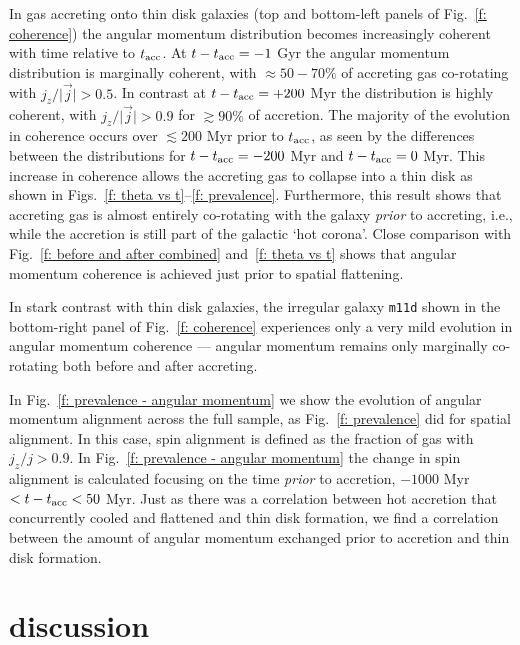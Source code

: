 \documentclass[fleqn,usenatbib]{mnras}
\newcommand{\tacc}{t_{\rm acc}}
\begin{document}
In gas accreting onto thin disk galaxies (top and bottom-left panels of Fig.~\ref{f: coherence})  the angular momentum distribution becomes increasingly coherent with time relative to $\tacc$.
At $t-\tacc=-1$ Gyr the angular momentum distribution is marginally coherent, with $\approx50-70\%$ of accreting gas co-rotating with $j_z/\vert \vec j \vert > 0.5$.
In contrast at $t-\tacc=+200$ Myr the distribution is highly coherent, with $j_z/\vert \vec j \vert > 0.9$ for $\gtrsim 90\%$ of accretion.
The majority of the evolution in coherence occurs over $\lesssim 200$ Myr prior to $\tacc$, as seen by the differences between the distributions for $t-\tacc=-200$ Myr and $t-\tacc=0$ Myr.
This increase in coherence allows the accreting gas to collapse into a thin disk as shown in Figs.~\ref{f: theta vs t}--\ref{f: prevalence}.
Furthermore, this result shows that accreting gas is almost entirely co-rotating with the galaxy {\em prior} to accreting, i.e., while the accretion is still part of the galactic `hot corona'. 
Close comparison with Fig.~\ref{f: before and after combined} and~\ref{f: theta vs t} shows that angular momentum coherence is achieved just prior to spatial flattening. 

In stark contrast with thin disk galaxies, the irregular galaxy \texttt{m11d} shown in the bottom-right panel of Fig.~\ref{f: coherence} experiences only a very mild evolution in angular momentum coherence --- angular momentum remains only marginally co-rotating both before and after accreting.

In Fig.~\ref{f: prevalence - angular momentum} we show the evolution of angular momentum alignment across the full sample, as Fig.~\ref{f: prevalence} did for spatial alignment. 
In this case, spin alignment is defined as the fraction of gas with $j_z/j > 0.9$.
In Fig.~\ref{f: prevalence - angular momentum} the change in spin alignment is calculated focusing on the time \textit{prior} to accretion, $-1000$ Myr $< t - \tacc < 50$ Myr.
Just as there was a correlation between hot accretion that concurrently cooled and flattened and thin disk formation, we find a correlation between the amount of angular momentum exchanged prior to accretion and thin disk formation.

\section{discussion}
\label{s: discussion}
\end{document}
